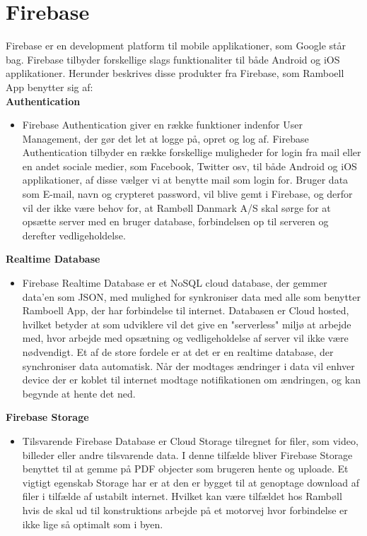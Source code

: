 \chapter{Firebase}
Firebase\cite{Firebase} er en development platform til mobile applikationer, som Google står bag. Firebase tilbyder forskellige slags funktionaliter til både Android og iOS applikationer. Herunder beskrives disse produkter fra Firebase, som Ramboell App benytter sig af: \\

\textbf{Authentication\cite{FirebaseAuth}}
\begin{itemize}[-]
	\itemsep 0.3em 
	\item[] Firebase Authentication giver en række funktioner indenfor User Management, der gør det let at logge på, opret og log af. Firebase Authentication tilbyder en række forskellige muligheder for login fra mail eller en andet sociale medier, som Facebook, Twitter osv, til både Android og iOS applikationer, af disse vælger vi at benytte mail som login for. Bruger data som E-mail, navn og crypteret password, vil blive gemt i Firebase, og derfor vil der ikke være behov for, at Rambøll Danmark A/S skal sørge for at opsætte server med en bruger database, forbindelsen op til serveren og derefter vedligeholdelse. 
	
\end{itemize}	
\textbf{Realtime Database\cite{FirebaseRealtimeDB}}
\begin{itemize}[-]
	\itemsep 0.3em 
	\item[]  Firebase Realtime Database er et NoSQL cloud database, der gemmer data'en som JSON\cite{JSON}, med mulighed for synkroniser data med alle som benytter Ramboell App, der har forbindelse til internet. Databasen er Cloud hosted, hvilket betyder at som udviklere vil det give en "serverless" miljø at arbejde med, hvor arbejde med opsætning og vedligeholdelse af server vil ikke være nødvendigt. Et af de store fordele er at det er en realtime database, der synchroniser data automatisk. Når der modtages ændringer i data vil enhver device der er koblet til internet modtage notifikationen om ændringen, og kan begynde at hente det ned. 
\end{itemize}
\textbf{Firebase Storage}
\begin{itemize}[-]
	\itemsep 0.3em 
	\item[] Tilsvarende Firebase Database er Cloud Storage tilregnet for filer, som video, billeder eller andre tilsvarende data. I denne tilfælde bliver Firebase Storage benyttet til at gemme på PDF objecter som brugeren hente og uploade. Et vigtigt egenskab Storage har er at den er bygget til at genoptage download af filer i tilfælde af ustabilt internet. Hvilket kan være tilfældet hos Rambøll hvis de skal ud til konstruktions arbejde på et motorvej hvor forbindelse er ikke lige så optimalt som i byen. 
\end{itemize}

